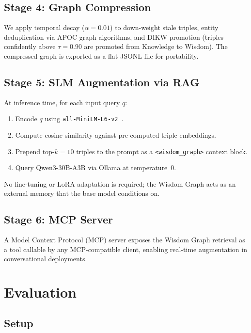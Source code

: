 \documentclass[11pt]{article}
\begin{document}
\subsection{Stage 4: Graph Compression}
We apply temporal decay ($\alpha = 0.01$) to down-weight stale triples,
entity deduplication via APOC graph algorithms, and DIKW promotion
(triples confidently above $\tau = 0.90$ are promoted from Knowledge to
Wisdom).
The compressed graph is exported as a flat JSONL file for portability.

\subsection{Stage 5: SLM Augmentation via RAG}
At inference time, for each input query $q$:
\begin{enumerate}
  \item Encode $q$ using \texttt{all-MiniLM-L6-v2}~\citep{reimers2019sbert}.
  \item Compute cosine similarity against pre-computed triple embeddings.
  \item Prepend top-$k=10$ triples to the prompt as a
        \texttt{<wisdom\_graph>} context block.
  \item Query Qwen3-30B-A3B via Ollama at temperature~0.
\end{enumerate}

No fine-tuning or LoRA adaptation is required; the Wisdom Graph acts as
an external memory that the base model conditions on.

\subsection{Stage 6: MCP Server}
A Model Context Protocol (MCP) server exposes the Wisdom Graph retrieval
as a tool callable by any MCP-compatible client, enabling real-time
augmentation in conversational deployments.

\section{Evaluation}
\label{sec:eval}

\subsection{Setup}
\end{document}
